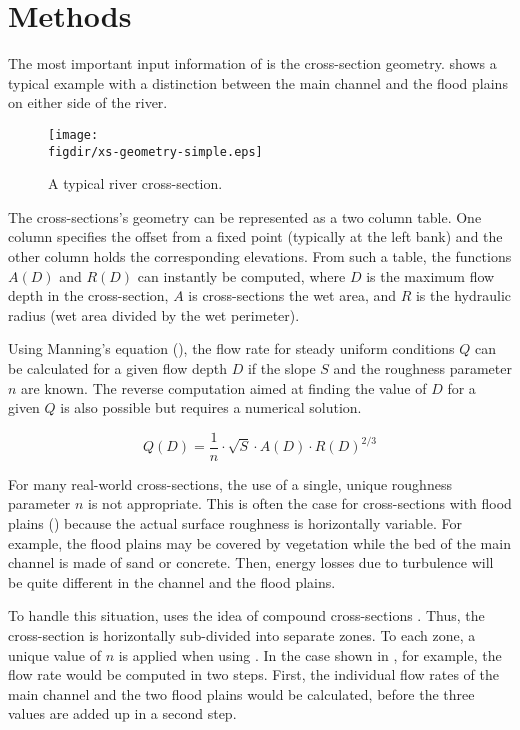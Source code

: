 \section{Methods} \label{sec:xsanalyzer:method}

The most important input information of  is the cross-section geometry.  shows a typical example with a distinction between the main channel and the flood plains on either side of the river.

\begin{figure}
  \centering
  \texttt{[image: \\figdir/xs-geometry-simple.eps]}
  \caption{A typical river cross-section. \label{fig:xsanalyzer:geometry}}
\end{figure}

The cross-sections's geometry can be represented as a two column table. One column specifies the offset from a fixed point (typically at the left bank) and the other column holds the corresponding elevations. From such a table, the functions $A(D)$ and $R(D)$ can instantly be computed, where $D$ is the maximum flow depth in the cross-section, $A$ is cross-sections the wet area, and $R$ is the hydraulic radius (wet area divided by the wet perimeter).

Using Manning's equation (), the flow rate for steady uniform conditions $Q$ can be calculated for a given flow depth $D$ if the slope $S$ and the roughness parameter $n$ are known. The reverse computation aimed at finding the value of $D$ for a given $Q$ is also possible but requires a numerical solution.

\begin{equation}
  Q(D) = \frac{1}{n} \cdot \sqrt{S} \cdot A(D) \cdot R(D)^{2/3} \label{eqn:xsanalyzer:manning}
\end{equation}

For many real-world cross-sections, the use of a single, unique roughness parameter $n$ is not appropriate. This is often the case for cross-sections with flood plains () because the actual surface roughness is horizontally variable. For example, the flood plains may be covered by vegetation while the bed of the main channel is made of sand or concrete. Then, energy losses due to turbulence will be quite different in the channel and the flood plains.

To handle this situation,  uses the idea of compound cross-sections \citep[see][]{Cunge1980}. Thus, the cross-section is horizontally sub-divided into separate zones. To each zone, a unique value of $n$ is applied when using . In the case shown in , for example, the flow rate would be computed in two steps. First, the individual flow rates of the main channel and the two flood plains would be calculated, before the three values are added up in a second step.

